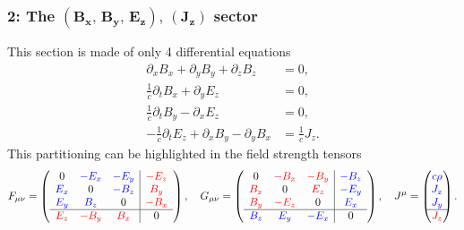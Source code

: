 \documentclass{article}
\begin{document}
\subsubsection*{2: The $\mathbf{\left(B_{x},\,B_{y},\,E_{z}\right),\,\left(J_{z}\right)}$ sector}
This section is made of only 4 differential equations
\begin{align}
    \partial_{x}B_{x}+\partial_{y}B_{y}+\partial_{z}B_{z}&=0,\\
    \frac{1}{c}\partial_{t}B_{x}+\partial_{y}E_{z}&=0,\\
     \frac{1}{c}\partial_{t}B_{y}-\partial_{x}E_{z}&=0,\\
     -\frac{1}{c}\partial_{t}E_{z}+\partial_{x}B_{y}-\partial_{y}B_{x}&=\frac{1}{c}J_{z}.
\end{align}
This partitioning can be highlighted in the field strength tensors
\begin{equation}
    F_{\mu\nu} = \begin{pmatrix}
        \begin{array}{ccc|c}
            0 & \color{blue}-E_x \color{black}& \color{blue}-E_y \color{black}& \color{red}-E_z\color{black} \\
            \color{blue}E_x \color{black}& 0 & \color{blue}-B_z\color{black} & \color{red}B_y \color{black}\\
            \color{blue}E_y \color{black}& \color{blue}B_z\color{black} & 0 & \color{red}-B_x\color{black} \\\hline
            \color{red}E_z\color{black} & \color{red}-B_y\color{black} & \color{red}B_x\color{black} & 0 \\
        \end{array}
    \end{pmatrix},\quad
    G_{\mu\nu} = \begin{pmatrix}
        \begin{array}{ccc|c}
            0 & \color{red}-B_x \color{black}& \color{red}-B_y \color{black}& \color{blue}-B_z\color{black} \\
            \color{red}B_x \color{black}& 0 & \color{red}E_z\color{black} & \color{blue}-E_y \color{black}\\
            \color{red}B_y \color{black}& \color{red}-E_z\color{black} & 0 & \color{blue}E_x\color{black} \\\hline
            \color{blue}B_z\color{black} & \color{blue}E_y\color{black} & \color{blue}-E_x\color{black} & 0 \\
        \end{array}
    \end{pmatrix}, \quad
    J^\mu = \begin{pmatrix}
        \color{blue}c \rho \color{black}\\
        \color{blue}J_{x}\color{black}\\
        \color{blue}J_{y}\color{black}\\\hline
        \color{red}J_{z}\color{black}\\
    \end{pmatrix}.
\end{equation}
\end{document}

